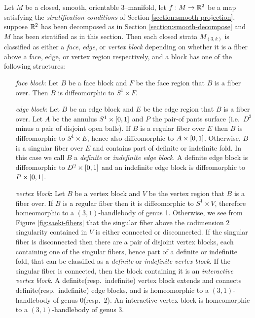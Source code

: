 \begin{theorem}
	\label{thm:block-structure}
	Let $M$ be a closed, smooth, orientable 3--manifold, let $f:M\to\mathbb{R}^2$ be a map satisfying the \emph{stratification conditions} of Section \ref{section:smooth-projection}, suppose $\mathbb{R}^2$ has been decomposed as in Section \ref{section:smooth-decompose} and $M$ has been stratified as in this section.
	Then each closed strata $M_{(3,k)}$ is classified as either a \emph{face}, \emph{edge}, or \emph{vertex block} depending on whether it is a fiber above a face, edge, or vertex region respectively, and a block has one of the following structures:
	\begin{enumerate}
		\item[\emph{face block}:]
		Let $B$ be a face block and $F$ be the face region that $B$ is a fiber over.
		Then $B$ is diffeomorphic to $S^1\times F$.
		
		\item[\emph{edge block}:]
		Let $B$ be an edge block and $E$ be the edge region that $B$ is a fiber over.
		Let $A$ be the annulus $S^1\times[0,1]$ and $P$ the pair-of pants surface (i.e.\ $D^2$ minus a pair of disjoint open balls).
		If $B$ is a regular fiber over $E$ then $B$ is diffeomorphic to $S^1\times E$, hence also diffeomorphic to $A\times[0,1]$.
		Otherwise, $B$ is a singular fiber over $E$ and contains part of definite or indefinite fold.
		In this case we call $B$ a \emph{definite} or \emph{indefinite edge block}.
		A definite edge block is diffeomorphic to $D^2\times[0,1]$ and an indefinite edge block is diffeomorphic to $P\times[0,1]$.

		\item[\emph{vertex block}:]
		Let $B$ be a vertex block and $V$ be the vertex region that $B$ is a fiber over.
		If $B$ is a regular fiber then it is diffeomorphic to $S^1\times V$, therefore homeomorphic to a $(3,1)$-handlebody of genus 1.
		Otherwise, we see from Figure \ref{fig:saeki-fibers} that the singular fiber above the codimension 2 singularity contained in $V$ is either connected or disconnected.
		If the singular fiber is disconnected then there are a pair of disjoint vertex blocks, each containing one of the singular fibers, hence part of a definite or indefinite fold,  that can be classified as a \emph{definite} or \emph{indefinite vertex block}.
		If the singular fiber is connected, then the block containing it is an \emph{interactive vertex block}.
		A definite(resp.\ indefinite) vertex block extends and connects definite(resp.\ indefinite) edge blocks, and is homeomorphic to a $(3,1)$-handlebody of genus 0(resp.\ 2).
		An interactive vertex block is homeomorphic to a $(3,1)$-handlebody of genus 3.
	\end{enumerate}
\end{theorem}

